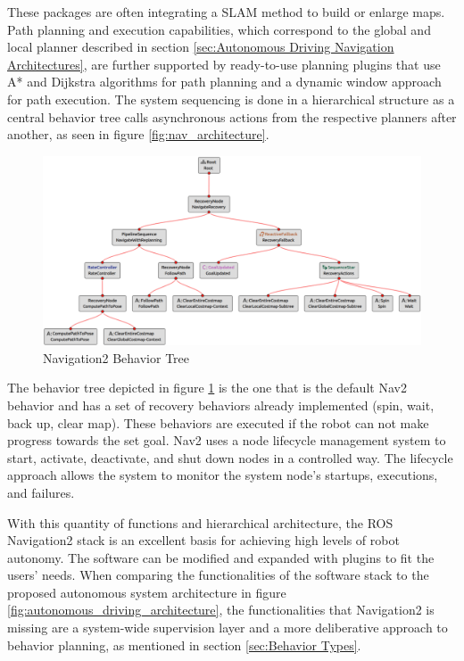 These packages are often integrating a SLAM method to build or enlarge maps. Path planning and execution capabilities, which correspond to the global and local planner described in section \ref{sec:Autonomous Driving Navigation Architectures}, are further supported by ready-to-use planning plugins that use A* and Dijkstra algorithms for path planning and a dynamic window approach for path execution. The system sequencing is done in a hierarchical structure as a central behavior tree calls asynchronous actions from the respective planners after another, as seen in figure \ref{fig:nav_architecture}. 

\begin{figure}[ht]
	\includegraphics[width=1.0\textwidth]{images/nav_bt-modified.png}
	\caption{Navigation2 Behavior Tree}
	\label{fig:bt_nav}
\end{figure}

The behavior tree depicted in figure \ref{fig:bt_nav} is the one that is the default Nav2 behavior and has a set of recovery behaviors already implemented (spin, wait, back up, clear map). These behaviors are executed if the robot can not make progress towards the set goal. Nav2 uses a node lifecycle management system to start, activate, deactivate, and shut down nodes in a controlled way. The lifecycle approach allows the system to monitor the system node's startups, executions, and failures.

With this quantity of functions and hierarchical architecture, the ROS Navigation2 stack is an excellent basis for achieving high levels of robot autonomy. The software can be modified and expanded with plugins to fit the users' needs. When comparing the functionalities of the software stack to the proposed autonomous system architecture in figure 	\ref{fig:autonomous_driving_architecture}, the functionalities that Navigation2 is missing are a system-wide supervision layer and a more deliberative approach to behavior planning, as mentioned in section \ref{sec:Behavior Types}.

